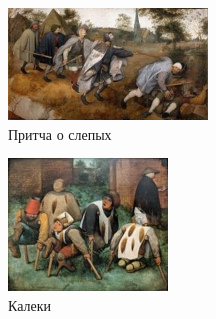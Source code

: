 \begin{figure}[ht]
    \centering
    \includegraphics{img/northern/9.jpg}
    \caption{Притча о слепых}
    \label{fig:north:9}
\end{figure}

\begin{figure}[ht]
    \centering
    \includegraphics{img/northern/10.jpg}
    \caption{Калеки}
    \label{fig:north:10}
\end{figure}